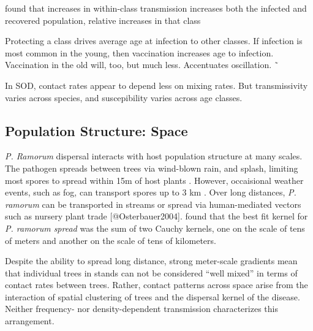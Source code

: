 \documentclass[english,nohyper,nofonts,nobib,nols,twoside]{tufte-handout}
\renewcommand\citep\cite
\let\oldcitet\citet
\renewcommand{\citet}[1]{\oldcitet{#1}\cite{#1}}
\begin{document}
\citet{Klepac2010} found that increases in within-class transmission
increases both the infected and recovered population, relative increases
in that class

Protecting a class drives average age at infection to other classes. If
infection is most common in the young, then vaccination increases age to
infection. Vaccination in the old will, too, but much less. Accentuates
oscillation. ˜

In SOD, contact rates appear to depend less on mixing rates. But
transmissivity varies across species, and suscepibility varies across
age classes.

\subsection{Population Structure: Space}

\emph{P. Ramorum} dispersal interacts with host population structure at
many scales. The pathogen spreads between trees via wind-blown rain, and
splash, limiting most spores to spread within 15m of host plants
\citep{Davidson2005}. However, occaisional weather events, such as fog,
can transport spores up to 3 km \citep{Rizzo2005}. Over long distances,
\emph{P. ramorum} can be transported in streams or spread via
human-mediated vectors such as nursery plant trade
{[}@Osterbauer2004{]}. \citet{Meentemeyer2011} found that the best fit
kernel for \emph{P. ramorum spread} was the sum of two Cauchy kernels,
one on the scale of tens of meters and another on the scale of tens of
kilometers.

Despite the ability to spread long distance, strong meter-scale
gradients mean that individual trees in stands can not be considered
``well mixed'' in terms of contact rates between trees. Rather, contact
patterns across space arise from the interaction of spatial clustering
of trees and the dispersal kernel of the disease. Neither frequency- nor
density-dependent transmission characterizes this arrangement.
\end{document}
